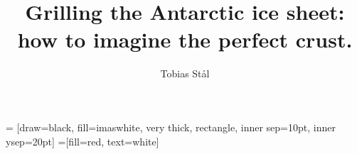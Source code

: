 \documentclass[25pt,final,hyperref={pdfpagelabels=false}]{beamer}
\title{{\fontsize{90}{100}\selectfont  Grilling the Antarctic ice sheet: \\  how to imagine the perfect crust.}} %
\author{\large Tobias Stål} %
\institute{\large University of Tasmania, Institute for Marine and Antarctic Studies} %
\begin{document}
 = [draw=black, fill=imaswhite, very thick,
rectangle, inner sep=10pt, inner ysep=20pt]
 =[fill=red, text=white]



\begin{frame}[t] %





\end{frame} %
\end{document}
